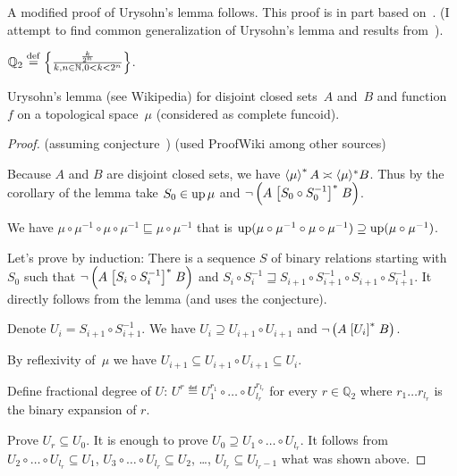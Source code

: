 A modified proof of Urysohn's lemma follows. This proof is in part based on~\cite{2014arXiv1410.1504B}.
(I attempt to find common generalization of Urysohn's lemma and results from~\cite{2014arXiv1410.1504B}).

$\mathbb{Q}_2 \overset{\mathrm{def}}{=} \left\{ \frac{ \frac{k}{2^n} }{k, n \in \mathbb{N}, 0 < k < 2^n }\right\}$.

\begin{thm}
Urysohn's lemma (see Wikipedia) for disjoint closed sets~$A$ and~$B$ and function~$f$ on a topological space~$\mu$
(considered as complete funcoid). 
\end{thm}

\begin{proof}
(assuming conjecture~) (used ProofWiki among other sources)

Because $A$ and $B$ are disjoint closed sets, we
have $\left\langle \mu\right\rangle ^{\ast} A \asymp \langle \mu
\rangle^{\ast} B$. Thus by the corollary of the lemma take $S_0 \in \operatorname{up}
\mu$ and $\neg \left( A \mathrel{\left[S_0 \circ S_0^{- 1}\right]^{\ast}} B
\right)$.

We have $\mu \circ \mu^{- 1} \circ \mu \circ \mu^{- 1}
\sqsubseteq \mu \circ \mu^{- 1}$ that is $\operatorname{up} (\mu
\circ \mu^{- 1} \circ \mu \circ \mu^{- 1}) \supseteq
\operatorname{up} (\mu \circ \mu^{- 1})$.

Let's prove by induction: There is a sequence $S$ of binary relations starting
with $S_0$ such that $\neg \left( A \mathrel{\left[S_i \circ S_i^{- 1}\right]^{\ast}} B
\right)$ and $S_i \circ S_i^{- 1} \sqsupseteq S_{i + 1} \circ S_{i + 1}^{- 1}
\circ S_{i + 1} \circ S_{i + 1}^{- 1}$. It directly follows from the lemma
(and uses the conjecture).

Denote $U_i = S_{i + 1} \circ S_{i + 1}^{- 1}$. We have $U_i \supseteq U_{i +
1} \circ U_{i + 1}$ and $\neg \left( A \mathrel{\left[U_i\right]^{\ast}} B \right)$.

By reflexivity of~$\mu$ we have $U_{i+1} \subseteq U_{i+1}\circ U_{i+1} \subseteq U_i$.

Define fractional degree of $U$: $U^r \eqdef U_1^{r_1} \circ
\ldots \circ U_{l_r}^{r_{l_r}}$ for every $r \in \mathbb{Q}_2$ where $r_1
\ldots r_{l_r}$ is the binary expansion of $r$.

Prove $U_r\subseteq U_0$. It is enough to prove
$U_0 \supseteq U_1 \circ \ldots \circ U_{l_r}$. It follows from $U_2 \circ
\ldots \circ U_{l_r} \subseteq U_1$, $U_3 \circ \ldots \circ U_{l_r} \subseteq
U_2$, \dots, $U_{l_r} \subseteq U_{l_r - 1}$ what was shown above.


\end{proof}
